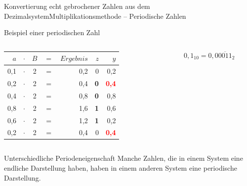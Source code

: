 \documentclass[xelatex,aspectratio=169]{beamer}
\begin{document}
\begin{frame}{Konvertierung echt gebrochener Zahlen aus dem Dezimalsystem}{Multiplikationsmethode -- Periodische Zahlen}
  \begin{exampleblock}{Beispiel einer periodischen Zahl}
    \begin{columns}
      \begin{column}{0.7\textwidth}
        \centering
        \begin{tabular}{rcccrrr}
          \toprule
          $a$ & $\cdot$ & $B$ & $=$ & $Ergebnis$ & $z$        & $y$                           \\
          \midrule
          0,1 & $\cdot$ & 2   & $=$ & 0,2        & 0          & 0,2                           \\
          0,2 & $\cdot$ & 2   & $=$ & 0,4        & \textbf{0} & \textbf{\textcolor{red}{0,4}} \\
          0,4 & $\cdot$ & 2   & $=$ & 0,8        & \textbf{0} & 0,8                           \\
          0,8 & $\cdot$ & 2   & $=$ & 1,6        & \textbf{1} & 0,6                           \\
          0,6 & $\cdot$ & 2   & $=$ & 1,2        & \textbf{1} & 0,2                           \\
          0,2 & $\cdot$ & 2   & $=$ & 0,4        & 0          & \textbf{\textcolor{red}{0,4}} \\
          \bottomrule
        \end{tabular}
      \end{column}
      \begin{column}{0.3\textwidth}
        \[ 0,1_{10} = 0,0\overline{0011}_{2} \]
      \end{column}
    \end{columns}
  \end{exampleblock}
  \begin{alertblock}{Unterschiedliche Periodeneigenschaft}
    Manche Zahlen, die in einem System eine endliche Darstellung haben, haben in einem anderen System eine periodische Darstellung.

  \end{alertblock}
\end{frame}
\end{document}
